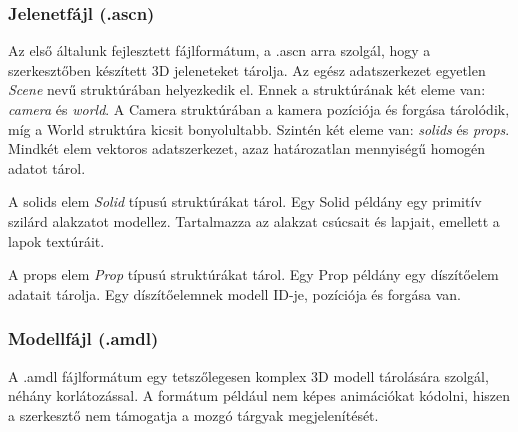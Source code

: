 \subsubsection{Jelenetfájl (.ascn)}

Az első általunk fejlesztett fájlformátum, a .ascn arra szolgál, hogy a szerkesztőben készített
3D jeleneteket tárolja. Az egész adatszerkezet egyetlen \emph{Scene} nevű struktúrában helyezkedik el.
Ennek a struktúrának két eleme van: \emph{camera} és \emph{world}. A Camera struktúrában a kamera pozíciója
és forgása tárolódik, míg a World struktúra kicsit bonyolultabb. Szintén két eleme van:
\emph{solids} és \emph{props}. Mindkét elem vektoros adatszerkezet, azaz határozatlan mennyiségű homogén adatot tárol.

A solids elem \emph{Solid} típusú struktúrákat tárol. Egy Solid példány egy primitív szilárd alakzatot
modellez. Tartalmazza az alakzat csúcsait és lapjait, emellett a lapok textúráit.

A props elem \emph{Prop} típusú struktúrákat tárol. Egy Prop példány egy díszítőelem adatait tárolja.
Egy díszítőelemnek modell ID-je, pozíciója és forgása van.

\subsubsection{Modellfájl (.amdl)}

A .amdl fájlformátum egy tetszőlegesen komplex 3D modell tárolására szolgál, néhány korlátozással.
A formátum például nem képes animációkat kódolni, hiszen a szerkesztő nem támogatja a mozgó tárgyak
megjelenítését.